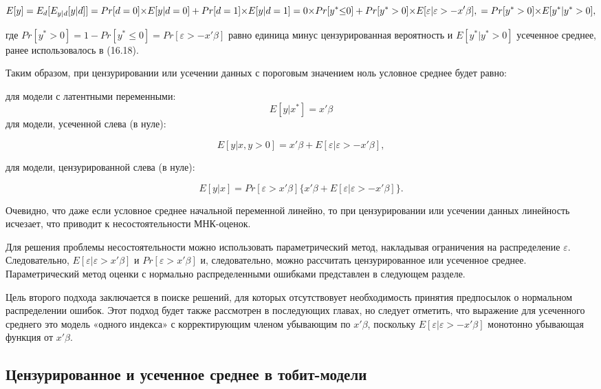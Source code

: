 \begin{equation}
E[y]=E_{d}[E_{y|d}[y|d]] \\
=Pr[d=0]{\times}E[y|d=0]+Pr[d=1]{\times}E[y|d=1]\\
=0{\times}Pr[y^{*}{\leq}0]+Pr[y^{*}>0]{\times}E[\varepsilon|\varepsilon>-x'\beta],\\
=Pr[y^{*}>0]{\times}E[y^{*}|y^{*}>0],
\end{equation}

где $Pr[y^{*}>0]=1-Pr[y^{*}{\leq}0]=Pr[\varepsilon>-x'\beta]$ равно единица минус цензурированная вероятность и $E[y^{*}|y^{*}>0]$ усеченное среднее, ранее использовалось в (16.18).

Таким образом, при цензурировании или усечении данных с пороговым значением ноль условное среднее будет равно:

для модели с латентными переменными: \[E[y|x^{*}]=x'\beta\]
для модели, усеченной слева (в нуле):

\begin{equation}
E[y|x,y>0]=x'\beta+E[\varepsilon|\varepsilon>-x'\beta],
\end{equation}

для модели, цензурированной слева (в нуле): 

\[
E[y|x]=Pr[{\varepsilon}>x'\beta]\lbrace{x'\beta+E[\varepsilon|\varepsilon>{-x}'\beta]}\rbrace.
\]

Очевидно, что даже если условное среднее начальной переменной линейно, то при цензурировании или усечении данных линейность исчезает, что приводит к несостоятельности МНК-оценок.

Для решения проблемы несостоятельности можно использовать параметрический метод, накладывая ограничения на распределение $\varepsilon$. Следовательно, $E[\varepsilon|\varepsilon>x'\beta]$ и $Pr[\varepsilon>x'\beta]$ и, следовательно, можно рассчитать цензурированное или усеченное среднее. Параметрический метод оценки с нормально распределенными ошибками представлен в следующем разделе.

Цель второго подхода заключается в поиске решений, для которых отсутствовует необходимость принятия предпосылок о нормальном распределении ошибок. Этот подход будет также рассмотрен в последующих главах, но следует отметить, что выражение для усеченного среднего это модель «одного индекса» с корректирующим членом убывающим по $x'\beta$, поскольку $E[\varepsilon|\varepsilon>-x'\beta]$ монотонно убывающая функция от $x'\beta$.

\subsection{Цензурированное и усеченное среднее в тобит-модели}

